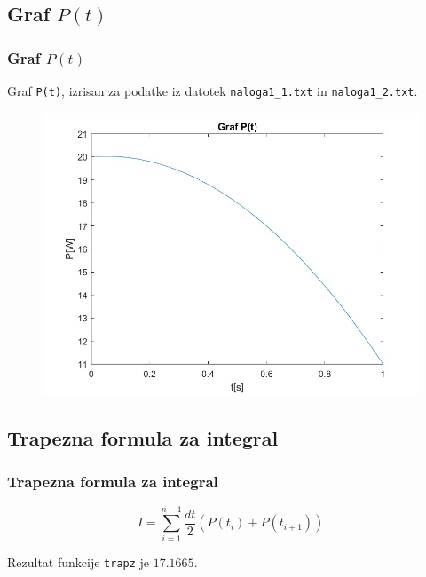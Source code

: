 \documentclass{beamer}
\begin{document}
\begin{frame} 
\section{Graf $P(t)$}
\frametitle{Graf $P(t)$}  
\vspace{10pt}
Graf \texttt{P(t)}, izrisan za podatke iz datotek \texttt{naloga1\_1.txt} in \texttt{naloga1\_2.txt}.
\begin{figure}
    \centering
    \includegraphics[width=0.9\linewidth]{Graf P(t).jpg}
    \label{P(t)}
\end{figure}
\end{frame} 

\begin{frame}
\section{Trapezna formula za integral}
\frametitle{Trapezna formula za integral}
\[
I = \sum_{i=1}^{n-1} \frac{dt}{2} \left( P(t_i) + P(t_{i+1}) \right)
\]


Rezultat funkcije \texttt{trapz} je \(17.1665\).
\end{frame}
\end{document}
